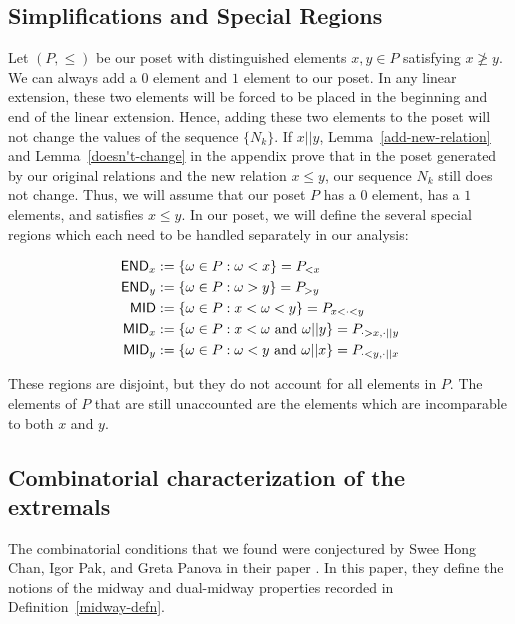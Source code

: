 \documentclass{puthesis-UG}
\begin{document}
\subsection{Simplifications and Special Regions}

Let $(P, \leq)$ be our poset with distinguished elements $x, y \in P$ satisfying $x \not \geq y$. We can always add a $0$ element and $1$ element to our poset. In any linear extension, these two elements will be forced to be placed in the beginning and end of the linear extension. Hence, adding these two elements to the poset will not change the values of the sequence $\{N_k\}$. If $x || y$, Lemma~\ref{add-new-relation} and Lemma~\ref{doesn't-change} in the appendix prove that in the poset generated by our original relations and the new relation $x \leq y$, our sequence $N_k$ still does not change. Thus, we will assume that our poset $P$ has a $0$ element, has a $1$ elements, and satisfies $x \leq y$. In our poset, we will define the several special regions which each need to be handled separately in our analysis:

\begin{align*}
		\mathsf{END}_x & := \{\omega \in P : \omega < x\} = P_{< x} \\
		\mathsf{END}_y & := \{\omega \in P : \omega > y\} = P_{> y} \\
		\mathsf{MID} & := \{\omega \in P : x < \omega < y\} = P_{x < \cdot < y} \\
		\mathsf{MID}_x & := \{\omega \in P : x < \omega \text{ and } \omega || y\} = P_{\cdot > x, \cdot || y} \\
		\mathsf{MID}_y & := \{\omega \in P : \omega < y \text{ and } \omega || x\} = P_{\cdot < y, \cdot || x} \\
\end{align*}

These regions are disjoint, but they do not account for all elements in $P$. The elements of $P$ that are still unaccounted are the elements which are incomparable to both $x$ and $y$. 

\subsection{Combinatorial characterization of the extremals}

The combinatorial conditions that we found were conjectured by Swee Hong Chan, Igor Pak, and Greta Panova in their paper \cite{chan2022extensions}. In this paper, they define the notions of the midway and dual-midway properties recorded in Definition~\ref{midway-defn}.
\end{document}
